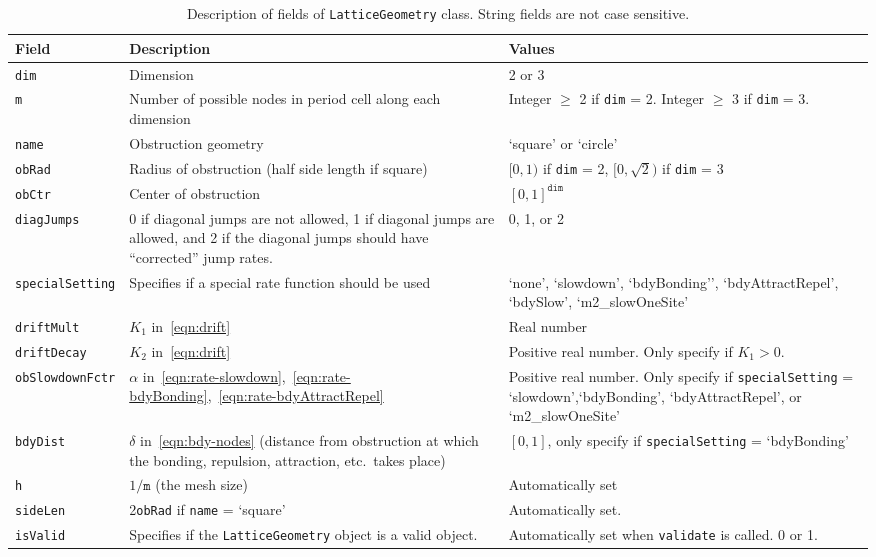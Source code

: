 \documentclass[11pt, oneside]{article}   	%
\theoremstyle{definition}
\begin{document}
\begin{table}
   \centering
   \begin{tabularx}{\linewidth}{lLL} %
      \toprule
      Field     & Description & Values \\
      \midrule
      \texttt{dim}				& Dimension & 2 or 3 \\ \hline
      \texttt{m}				& Number of possible nodes in period cell along each dimension & Integer $\geq$ 2 if \texttt{dim} = 2. Integer $\geq$ 3 if \texttt{dim} = 3.\\ \hline
      \texttt{name} 			& Obstruction geometry & `square' or `circle' \\ \hline
      \texttt{obRad}			& Radius of obstruction (half side length if square) & $[0,1)$ if \texttt{dim} = 2, $[0,\sqrt{2})$ if \texttt{dim} = 3 \\ \hline
      \texttt{obCtr}			& Center of obstruction & $[0,1]^{\texttt{dim}}$\\ \hline
      \texttt{diagJumps}		& 0 if diagonal jumps are not allowed, 1 if diagonal jumps are allowed, and 2 if the diagonal jumps should have ``corrected'' jump rates. & 0, 1, or 2 \\ \hline
      \texttt{specialSetting} 	& Specifies if a special rate function should be used & `none', `slowdown', `bdyBonding'', `bdyAttractRepel', `bdySlow', `m2\_slowOneSite' \\ \hline
      \texttt{driftMult}		& $K_1$ in~\eqref{eqn:drift} & Real number \\ \hline
      \texttt{driftDecay}		& $K_2$ in~\eqref{eqn:drift} & Positive real number. Only specify if $K_1 > 0$. \\ \hline
      \texttt{obSlowdownFctr}	& $\alpha$ in~\eqref{eqn:rate-slowdown},~\eqref{eqn:rate-bdyBonding},~\eqref{eqn:rate-bdyAttractRepel} & Positive real number. Only specify if \texttt{specialSetting} = `slowdown',`bdyBonding', `bdyAttractRepel', or `m2\_slowOneSite' \\ \hline
      \texttt{bdyDist}			& $\delta$ in~\eqref{eqn:bdy-nodes} (distance from obstruction at which the bonding, repulsion, attraction, etc.\ takes place) & $[0,1]$, only specify if \texttt{specialSetting} = `bdyBonding' \\ \hline
      \texttt{h}				& $1/\texttt{m}$ (the mesh size) & Automatically set \\ \hline
      \texttt{sideLen}			& 2\texttt{obRad} if \texttt{name} = `square' & Automatically set.\\ \hline
      \texttt{isValid}			& Specifies if the \texttt{LatticeGeometry} object is a valid object. & Automatically set when \texttt{validate} is called. 0 or 1.\\
      \bottomrule
   \end{tabularx}
   \caption{Description of fields of \texttt{LatticeGeometry} class. String fields are not case sensitive.}
   \label{tab:latticegeometry-fields}
\end{table}
\end{document}
